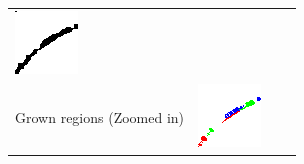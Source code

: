 \documentclass[preprint]{iucr}              %
\begin{document}
\begin{figure}
\begin{tabular}{>{\centering\arraybackslash}m{.1\linewidth}>{\centering\arraybackslash}m{.25\linewidth}>{\centering\arraybackslash}m{.25\linewidth}>{\centering\arraybackslash}m{.25\linewidth}}
\includegraphics[width=\linewidth]{Detail/Thinned.png}
\\
Grown regions (Zoomed in)&
\includegraphics[width=\linewidth]{Detail/o_max1_Regs_Zin_Smooth.png}& &

\end{tabular}
\end{figure}
\end{document}

